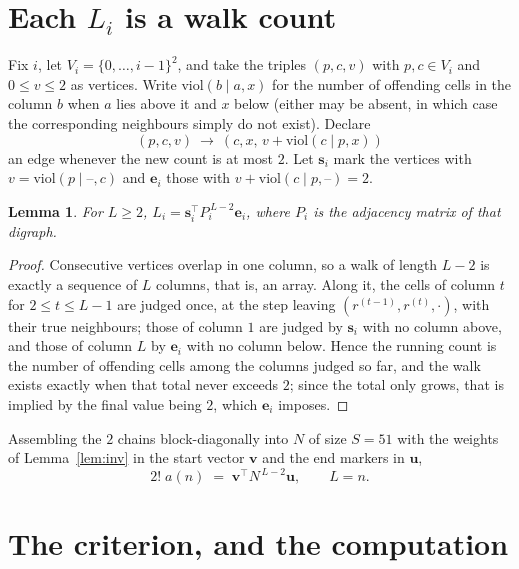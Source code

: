 \documentclass[11pt,a4paper]{article}
\theoremstyle{plain}
\newtheorem{lemma}[theorem]{Lemma}
\theoremstyle{definition}
\begin{document}
\section{Each $L_i$ is a walk count}

Fix $i$, let $V_i=\{0,\dots,i-1\}^{2}$, and take the triples $(p,c,v)$ with
$p,c\in V_i$ and $0\le v\le2$ as vertices. Write $\mathrm{viol}(b\mid a,x)$ for the number
of offending cells in the column $b$ when $a$ lies above it and $x$ below (either may be
absent, in which case the corresponding neighbours simply do not exist). Declare
\[
(p,c,v)\ \longrightarrow\ (c,x,\,v+\mathrm{viol}(c\mid p,x))
\]
an edge whenever the new count is at most $2$. Let $\mathbf{s}_i$ mark the vertices with
$v=\mathrm{viol}(p\mid\text{--},c)$ and $\mathbf{e}_i$ those with
$v+\mathrm{viol}(c\mid p,\text{--})=2$.

\begin{lemma}\label{lem:walk}
For $L\ge2$, $L_i=\mathbf{s}_i^{\!\top}P_i^{\,L-2}\mathbf{e}_i$, where $P_i$ is the
adjacency matrix of that digraph.
\end{lemma}

\begin{proof}
Consecutive vertices overlap in one column, so a walk of length $L-2$ is exactly a sequence
of $L$ columns, that is, an array. Along it, the cells of column $t$ for $2\le t\le L-1$ are
judged once, at the step leaving $(r^{(t-1)},r^{(t)},\cdot)$, with their true neighbours;
those of column $1$ are judged by $\mathbf{s}_i$ with no column above, and those of column
$L$ by $\mathbf{e}_i$ with no column below. Hence the running count is the number of
offending cells among the columns judged so far, and the walk exists exactly when that total
never exceeds $2$; since the total only grows, that is implied by the final value being
$2$, which $\mathbf{e}_i$ imposes.
\end{proof}

Assembling the $2$ chains block-diagonally into $N$ of size $S=51$ with the weights of
Lemma~\ref{lem:inv} in the start vector $\mathbf{v}$ and the end markers in
$\mathbf{u}$,
\begin{equation}\label{eq:walk2}
2!\;a(n)\;=\;\mathbf{v}^{\!\top}N^{\,L-2}\mathbf{u},\qquad L=n .
\end{equation}

\section{The criterion, and the computation}
\end{document}
